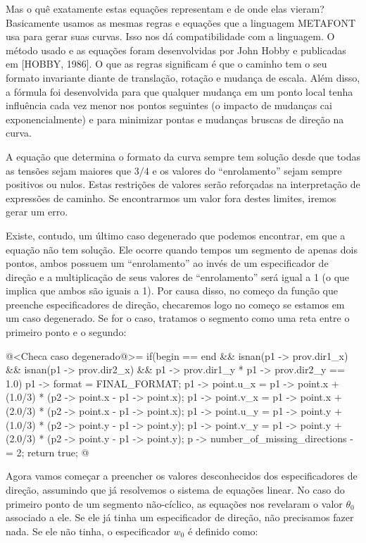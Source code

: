 Mas o quê exatamente estas equações representam e de onde elas vieram?
Basicamente usamos as mesmas regras e equações que a linguagem
METAFONT usa para gerar suas curvas. Isso nos dá compatibilidade com a
linguagem. O método usado e as equações foram desenvolvidas por John
Hobby e publicadas em [HOBBY, 1986]. O que as regras
significam é que o caminho tem o seu formato invariante diante de
translação, rotação e mudança de escala. Além disso, a fórmula foi
desenvolvida para que qualquer mudança em um ponto local tenha
influência cada vez menor nos pontos seguintes (o impacto de mudanças
cai exponencialmente) e para minimizar pontas e mudanças bruscas de
direção na curva.

A equação que determina o formato da curva sempre tem solução desde
que todas as tensões sejam maiores que $3/4$ e os valores do
``enrolamento'' sejam sempre positivos ou nulos. Estas restrições de
valores serão reforçadas na interpretação de expressões de caminho. Se
encontrarmos um valor fora destes limites, iremos gerar um erro.

Existe, contudo, um último caso degenerado que podemos encontrar, em
que a equação não tem solução. Ele ocorre quando tempos um segmento de
apenas dois pontos, ambos possuem um ``enrolamento'' ao invés de um
especificador de direção e a multiplicação de seus valores de
``enrolamento'' será igual a 1 (o que implica que ambos são iguais a
1). Por causa disso, no começo da função que preenche especificadores
de direção, checaremos logo no começo se estamos em um caso
degenerado. Se for o caso, tratamos o segmento como uma reta entre o
primeiro ponto e o segundo:

\iniciocodigo
@<Checa caso degenerado@>=
if(begin == end && isnan(p1 -> prov.dir1_x) && isnan(p1 -> prov.dir2_x) &&
   p1 -> prov.dir1_y * p1 -> prov.dir2_y == 1.0){
  p1 -> format = FINAL_FORMAT;
  p1 -> point.u_x = p1 -> point.x + (1.0/3) * (p2 -> point.x - p1 -> point.x);
  p1 -> point.v_x = p1 -> point.x + (2.0/3) * (p2 -> point.x - p1 -> point.x);
  p1 -> point.u_y = p1 -> point.y + (1.0/3) * (p2 -> point.y - p1 -> point.y);
  p1 -> point.v_y = p1 -> point.y + (2.0/3) * (p2 -> point.y - p1 -> point.y);
  p -> number_of_missing_directions -= 2;
  return true;
}
@
\fimcodigo

Agora vamos começar a preencher os valores desconhecidos dos
especificadores de direção, assumindo que já resolvemos o sistema de
equações linear. No caso do primeiro ponto de um segmento não-cíclico,
as equações nos revelaram o valor $\theta_0$ associado a ele. Se ele
já tinha um especificador de direção, não precisamos fazer nada. Se
ele não tinha, o especificador $w_0$ é definido como:

